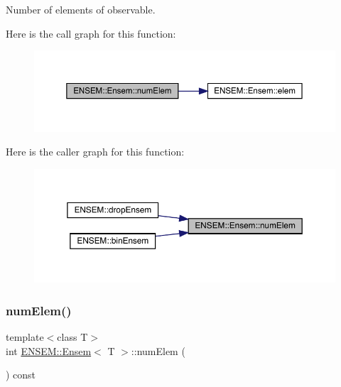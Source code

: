 Number of elements of observable. 

Here is the call graph for this function\+:
\nopagebreak
\begin{figure}[H]
\begin{center}
\leavevmode
\includegraphics[width=350pt]{d7/d3e/classENSEM_1_1Ensem_a495a563176192200eca2f16978158750_cgraph}
\end{center}
\end{figure}
Here is the caller graph for this function\+:
\nopagebreak
\begin{figure}[H]
\begin{center}
\leavevmode
\includegraphics[width=350pt]{d7/d3e/classENSEM_1_1Ensem_a495a563176192200eca2f16978158750_icgraph}
\end{center}
\end{figure}
\mbox{\label{classENSEM_1_1Ensem_a495a563176192200eca2f16978158750}} 
\subsubsection{\texorpdfstring{numElem()}{numElem()}\hspace{0.1cm}{\footnotesize\ttfamily [3/3]}}
{\footnotesize\ttfamily template$<$class T$>$ \\
int \mbox{\hyperlink{classENSEM_1_1Ensem}{E\+N\+S\+E\+M\+::\+Ensem}}$<$ T $>$\+::num\+Elem (\begin{DoxyParamCaption}{ }\end{DoxyParamCaption}) const\hspace{0.3cm}{\ttfamily [inline]}}



